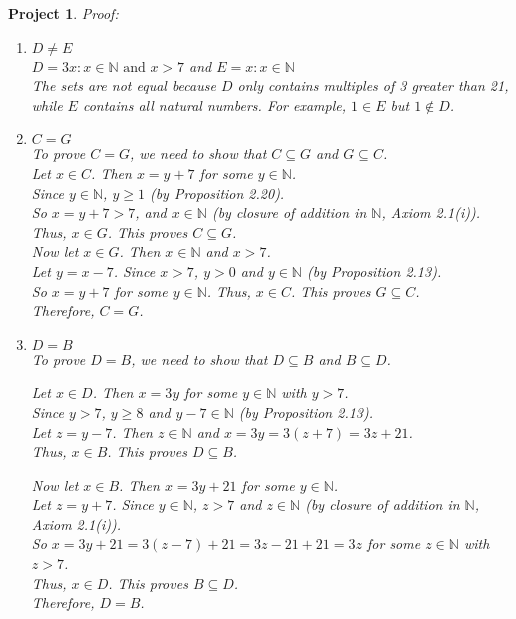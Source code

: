 \documentclass[12pt]{article}
\newtheorem{project}{Project}
\newcommand{\setprojnum}[1]{\renewcommand{\theproject}{#1}}
\begin{document}
\setprojnum{5.3}
\begin{project}
Proof:

\begin{enumerate}
\item[(i)] $D \neq E$ \\
$D = {3x : x \in \mathbb{N} \text{ and } x > 7}$ and $E = {x : x \in \mathbb{N}}$ \\
The sets are not equal because $D$ only contains multiples of 3 greater than 21, while $E$ contains all natural numbers. For example, $1 \in E$ but $1 \notin D$.

\item[(ii)] $C = G$ \\
To prove $C = G$, we need to show that $C \subseteq G$ and $G \subseteq C$.\\
Let $x \in C$. Then $x = y + 7$ for some $y \in \mathbb{N}$. \\
Since $y \in \mathbb{N}$, $y \geq 1$ (by Proposition 2.20). \\
So $x = y + 7 > 7$, and $x \in \mathbb{N}$ (by closure of addition in $\mathbb{N}$, Axiom 2.1(i)). \\
Thus, $x \in G$. This proves $C \subseteq G$. \\

Now let $x \in G$. Then $x \in \mathbb{N}$ and $x > 7$. \\
Let $y = x - 7$. Since $x > 7$, $y > 0$ and $y \in \mathbb{N}$ (by Proposition 2.13). \\
So $x = y + 7$ for some $y \in \mathbb{N}$. Thus, $x \in C$. This proves $G \subseteq C$.\\

Therefore, $C = G$.

\item[(iii)] $D = B$ \\
To prove $D = B$, we need to show that $D \subseteq B$ and $B \subseteq D$.

Let $x \in D$. Then $x = 3y$ for some $y \in \mathbb{N}$ with $y > 7$. \\
Since $y > 7$, $y \geq 8$ and $y - 7 \in \mathbb{N}$ (by Proposition 2.13). \\
Let $z = y - 7$. Then $z \in \mathbb{N}$ and $x = 3y = 3(z + 7) = 3z + 21$. \\
Thus, $x \in B$. This proves $D \subseteq B$.

Now let $x \in B$. Then $x = 3y + 21$ for some $y \in \mathbb{N}$. \\
Let $z = y + 7$. Since $y \in \mathbb{N}$, $z > 7$ and $z \in \mathbb{N}$ (by closure of addition in $\mathbb{N}$, Axiom 2.1(i)). \\
So $x = 3y + 21 = 3(z - 7) + 21 = 3z - 21 + 21 = 3z$ for some $z \in \mathbb{N}$ with $z > 7$. \\
Thus, $x \in D$. This proves $B \subseteq D$.\\

Therefore, $D = B$.
\end{enumerate}
\end{project}
\end{document}
